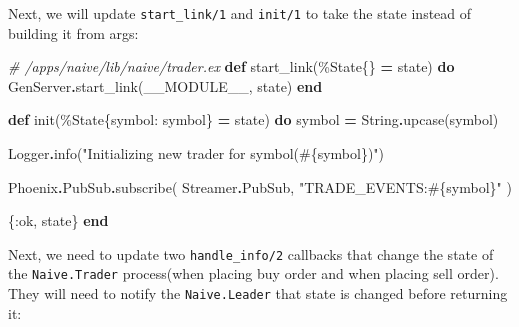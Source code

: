 \documentclass[
]{book}
\newenvironment{Shaded}{\begin{snugshade}}{\end{snugshade}}
\newcommand{\CommentTok}[1]{\textcolor[rgb]{0.56,0.35,0.01}{\textit{#1}}}
\newcommand{\ConstantTok}[1]{\textcolor[rgb]{0.00,0.00,0.00}{#1}}
\newcommand{\KeywordTok}[1]{\textcolor[rgb]{0.13,0.29,0.53}{\textbf{#1}}}
\newcommand{\NormalTok}[1]{#1}
\newcommand{\OperatorTok}[1]{\textcolor[rgb]{0.81,0.36,0.00}{\textbf{#1}}}
\newcommand{\OtherTok}[1]{\textcolor[rgb]{0.56,0.35,0.01}{#1}}
\newcommand{\StringTok}[1]{\textcolor[rgb]{0.31,0.60,0.02}{#1}}
\newcommand{\VariableTok}[1]{\textcolor[rgb]{0.00,0.00,0.00}{#1}}
\begin{document}
Next, we will update \texttt{start\_link/1} and \texttt{init/1} to take the state instead of building it from args:

\begin{Shaded}
\begin{Highlighting}[]
  \CommentTok{\# /apps/naive/lib/naive/trader.ex}
  \KeywordTok{def}\NormalTok{ start\_link(\%}\ConstantTok{State}\NormalTok{\{\} }\OperatorTok{=}\NormalTok{ state) }\KeywordTok{do}
    \ConstantTok{GenServer}\OperatorTok{.}\NormalTok{start\_link(}\ConstantTok{\_\_MODULE\_\_}\NormalTok{, state)}
  \KeywordTok{end}

  \KeywordTok{def}\NormalTok{ init(\%}\ConstantTok{State}\NormalTok{\{}\VariableTok{symbol:}\NormalTok{ symbol\} }\OperatorTok{=}\NormalTok{ state) }\KeywordTok{do}
\NormalTok{    symbol }\OperatorTok{=} \ConstantTok{String}\OperatorTok{.}\NormalTok{upcase(symbol)}

    \ConstantTok{Logger}\OperatorTok{.}\NormalTok{info(}\StringTok{"Initializing new trader for symbol(}\OtherTok{\#\{}\NormalTok{symbol}\OtherTok{\}}\StringTok{)"}\NormalTok{)}

    \ConstantTok{Phoenix}\OperatorTok{.}\ConstantTok{PubSub}\OperatorTok{.}\NormalTok{subscribe(}
      \ConstantTok{Streamer}\OperatorTok{.}\ConstantTok{PubSub}\NormalTok{,}
      \StringTok{"TRADE\_EVENTS:}\OtherTok{\#\{}\NormalTok{symbol}\OtherTok{\}}\StringTok{"}
\NormalTok{    )}

\NormalTok{    \{}\VariableTok{:ok}\NormalTok{, state\}}
  \KeywordTok{end}
\end{Highlighting}
\end{Shaded}

Next, we need to update two \texttt{handle\_info/2} callbacks that change the state of the \texttt{Naive.Trader} process(when placing buy order and when placing sell order). They will need to notify the \texttt{Naive.Leader} that state is changed before returning it:
\end{document}
